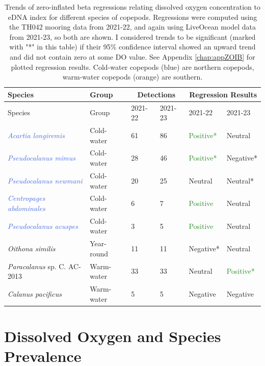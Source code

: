 \documentclass[12pt,twoside]{reedthesis}
\begin{document}
	\begin{table}[!h] 
			\begin{tabular}{l | l | l l | l l}
				\toprule
				Species & Group & \multicolumn{2}{|c|}{Detections} & \multicolumn{2}{|c}{Regression Results} \tabularnewline
				\midrule
				Species &  Group & 2021-22 & 2021-23 & 2021-22 & 2021-23  \\ 
				\midrule 
				\textcolor{RoyalBlue}{\textit{Acartia longiremis}}	& Cold-water & 61 & 86 & \textcolor{ForestGreen}{Positive*} & Neutral  \\
				\textcolor{RoyalBlue}{\textit{Pseudocalanus mimus}} & Cold-water & 28  & 46 & \textcolor{ForestGreen}{Positive*} & \textcolor{BrickRed}{Negative*}  \\
				\textcolor{RoyalBlue}{\textit{Pseudocalanus newmani}}	& Cold-water & 20  & 25 & Neutral & Neutral* \\
				\textcolor{RoyalBlue}{\textit{Centropages abdominales}} & Cold-water & 6 & 7 & \textcolor{ForestGreen}{Positive} & Neutral   \\
				\textcolor{RoyalBlue}{\textit{Pseudocalanus acuspes}}  & Cold-water & 3  & 5 & \textcolor{ForestGreen}{Positive} & Neutral  \\
				\textit{Oithona similis} & Year-round & 11  & 11 & Negative* & Neutral \\
				\textcolor{RedOrange}{\textit{Paracalanus} sp. C. AC-2013} & Warm-water & 33  & 33 & Neutral & \textcolor{ForestGreen}{Positive*}  \\
				\textcolor{RedOrange}{\textit{Calanus pacificus}}	& Warm-water & 5  & 5 & \textcolor{BrickRed}{Negative} & \textcolor{BrickRed}{Negative}  \\
				\bottomrule 
			\end{tabular}
			\label{ZOIBtab}
			\caption[Zero-inflated beta regression results]{Trends of zero-inflated beta regressions relating dissolved oxygen concentration to eDNA index for different species of copepods. Regressions were computed using the TH042 mooring data from 2021-22, and again using LiveOcean model data from 2021-23, so both are shown. I considered trends to be significant (marked with "*" in this table) if their 95\% confidence interval showed an upward trend and did not contain zero at some DO value. See Appendix \ref{chap:appZOIB} for plotted regression results. Cold-water copepods (blue) are northern copepods, warm-water copepods (orange) are southern.}  
	\end{table}
	
	\section{Dissolved Oxygen and Species Prevalence} 
	
\end{document}
